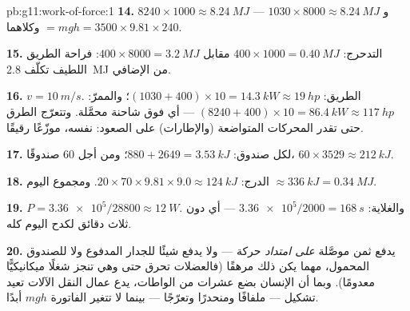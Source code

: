 \begin{solution}{pb:g11:work-of-force:1}
\textbf{14.} $8240 \times 1000 \approx \qty{8.24}{MJ}$ و
$1030 \times 8000 \approx \qty{8.24}{MJ}$ --- وكلاهما $= mgh = 3500
\times 9.81 \times 240$.

\textbf{15.}  التدحرج: $400 \times 1000 = \qty{0.40}{MJ}$
مقابل $400 \times 8000 = \qty{3.2}{MJ}$: فراحة الطريق اللطيف
تكلّف \qty{2.8}{MJ} من  الإضافي.

\textbf{16.} $v = \qty{10}{m/s}$. الطريق:
$(1030 + 400) \times 10 = \qty{14.3}{kW} \approx \qty{19}{hp}$؛ والممرّ:
$(8240 + 400) \times 10 = \qty{86.4}{kW} \approx \qty{117}{hp}$ ---
أي فوق  شاحنة محمَّلة. وتتعرّج الطرق حتى تقدر المحركات المتواضعة (والإطارات)
على الصعود:  نفسه، موزّعًا رقيقًا.

\textbf{17.} لكل صندوق: $880 + 2649 = \qty{3.53}{kJ}$؛ ومن أجل $60$ صندوقًا،
$60 \times 3529 \approx \qty{212}{kJ}$.

\textbf{18.} الدرج: $20 \times 70 \times 9.81 \times 9.0 \approx
\qty{124}{kJ}$. ومجموع اليوم $\approx \qty{336}{kJ} = \qty{0.34}{MJ}$.

\textbf{19.} $P = \num{3.36e5}/28800 \approx \qty{12}{W}$. والغلاية:
$\num{3.36e5}/2000 = \qty{168}{s}$ --- أي دون ثلاث دقائق لكدح
اليوم كله.

\textbf{20.} يدفع  ثمن  موصَّلة \emph{على امتداد} حركة
--- ولا يدفع شيئًا للجدار المدفوع ولا للصندوق المحمول، مهما يكن ذلك مرهقًا
(فالعضلات تحرق  حتى وهي تنجز شغلًا ميكانيكيًّا معدومًا). وبما أن
 الإنسان بضع عشرات من الواطات، يدع عمال النقل الآلات تعيد تشكيل
 --- ملفافًا ومنحدرًا وتعرّجًا --- بينما لا تتغير الفاتورة $mgh$
أبدًا.
\end{solution}
